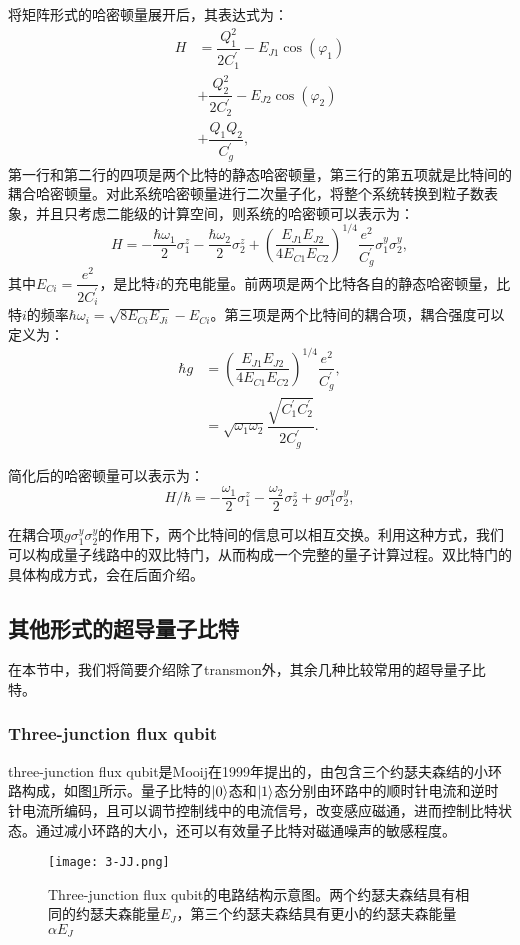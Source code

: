 将矩阵形式的哈密顿量展开后，其表达式为：
\begin{equation}
	\begin{split}
		H &= \dfrac{Q_{1}^{2}}{2C_{1}^{'}} - E_{J1}\cos(\varphi_1)\\
		&+\dfrac{Q_{2}^{2}}{2C_{2}^{'}} - E_{J2}\cos(\varphi_2)\\
		&+\dfrac{Q_{1}Q_{2}}{C_{g}^{'}},
	\end{split}
\end{equation}
第一行和第二行的四项是两个比特的静态哈密顿量，第三行的第五项就是比特间的耦合哈密顿量。对此系统哈密顿量进行二次量子化，将整个系统转换到粒子数表象，并且只考虑二能级的计算空间，则系统的哈密顿可以表示为：
\begin{equation}
	H = -\dfrac{\hbar\omega_{1}}{2}\sigma^{z}_{1}-\dfrac{\hbar\omega_{2}}{2}\sigma^{z}_{2}+(\dfrac{E_{J1}E_{J2}}{4E_{C1}E_{C2}})^{1/4}\dfrac{{e}^{2}}{C_{g}^{'}}\sigma^{y}_{1}\sigma^{y}_{2},
\end{equation}
其中$E_{Ci}=\dfrac{{e}^2}{2C_{i}^{'}}$，是比特$i$的充电能量。前两项是两个比特各自的静态哈密顿量，比特$ i $的频率$ \hbar\omega_{i}=\sqrt{8E_{Ci}E_{Ji}}-E_{Ci}$。第三项是两个比特间的耦合项，耦合强度可以定义为：
\begin{equation}
	\begin{split}
		\hbar g &= (\dfrac{E_{J1}E_{J2}}{4E_{C1}E_{C2}})^{1/4}\dfrac{{e}^{2}}{C_{g}^{'}},\\
		&=\sqrt{\omega_{1}\omega_{2}}\dfrac{\sqrt{C_{1}^{'}C_{2}^{'}}}{2C_{g}^{'}}.
	\end{split}
\end{equation}

简化后的哈密顿量可以表示为：
\begin{equation}
	H/\hbar = -\dfrac{\omega_{1}}{2}\sigma^{z}_{1}-\dfrac{\omega_{2}}{2}\sigma^{z}_{2}+g\sigma^{y}_{1}\sigma^{y}_{2},
\end{equation}

在耦合项$g\sigma^{y}_{1}\sigma^{y}_{2}$的作用下，两个比特间的信息可以相互交换。利用这种方式，我们可以构成量子线路中的双比特门，从而构成一个完整的量子计算过程。双比特门的具体构成方式，会在后面介绍。
\subsection{其他形式的超导量子比特}
在本节中，我们将简要介绍除了transmon外，其余几种比较常用的超导量子比特。
\subsubsection{Three-junction flux qubit}
three-junction flux qubit是Mooij在1999年提出的，由包含三个约瑟夫森结的小环路构成，如图\ref{fig:3-JJ}所示。量子比特的$\left|0\right>$态和$\left|1\right>$态分别由环路中的顺时针电流和逆时针电流所编码，且可以调节控制线中的电流信号，改变感应磁通，进而控制比特状态。通过减小环路的大小，还可以有效量子比特对磁通噪声的敏感程度。
\begin{figure}[h]
	\centering
	\texttt{[image: 3-JJ.png]}
	\caption{Three-junction flux qubit的电路结构示意图。两个约瑟夫森结具有相同的约瑟夫森能量$E_{J}$，第三个约瑟夫森结具有更小的约瑟夫森能量$\alpha E_{J}$}
	\label{fig:3-JJ}
\end{figure}

